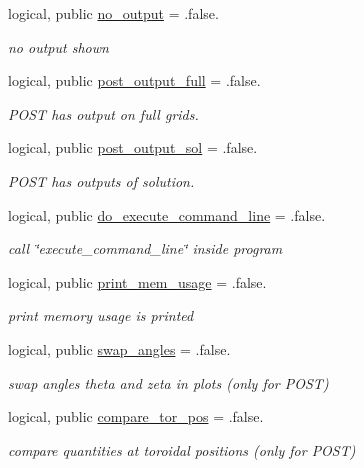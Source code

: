\begin{DoxyCompactItemize}
logical, public \hyperlink{namespacenum__vars_a324342d6240045750e38ef545801c49d}{no\+\_\+output} = .false.
\begin{DoxyCompactList}\small\item\em no output shown \end{DoxyCompactList}\item 
logical, public \hyperlink{namespacenum__vars_a7d65e7e9a9c8d9882929fc014b81a81b}{post\+\_\+output\+\_\+full} = .false.
\begin{DoxyCompactList}\small\item\em P\+O\+ST has output on full grids. \end{DoxyCompactList}\item 
logical, public \hyperlink{namespacenum__vars_a500deb6ae4c6ba1171c44513e1aac62b}{post\+\_\+output\+\_\+sol} = .false.
\begin{DoxyCompactList}\small\item\em P\+O\+ST has outputs of solution. \end{DoxyCompactList}\item 
logical, public \hyperlink{namespacenum__vars_ad5ba241cde0a99cdd5b3d6a6c0340e5c}{do\+\_\+execute\+\_\+command\+\_\+line} = .false.
\begin{DoxyCompactList}\small\item\em call \char`\"{}execute\+\_\+command\+\_\+line\char`\"{} inside program \end{DoxyCompactList}\item 
logical, public \hyperlink{namespacenum__vars_a28bf4f706f43af630ecc697dec01654c}{print\+\_\+mem\+\_\+usage} = .false.
\begin{DoxyCompactList}\small\item\em print memory usage is printed \end{DoxyCompactList}\item 
logical, public \hyperlink{namespacenum__vars_adaf8e128a1b232b8231305be41a55bdc}{swap\+\_\+angles} = .false.
\begin{DoxyCompactList}\small\item\em swap angles theta and zeta in plots (only for P\+O\+ST) \end{DoxyCompactList}\item 
logical, public \hyperlink{namespacenum__vars_a2f303733b113f96fad56bb8ceb337c85}{compare\+\_\+tor\+\_\+pos} = .false.
\begin{DoxyCompactList}\small\item\em compare quantities at toroidal positions (only for P\+O\+ST) \end{DoxyCompactList}\item 

\end{DoxyCompactItemize}
